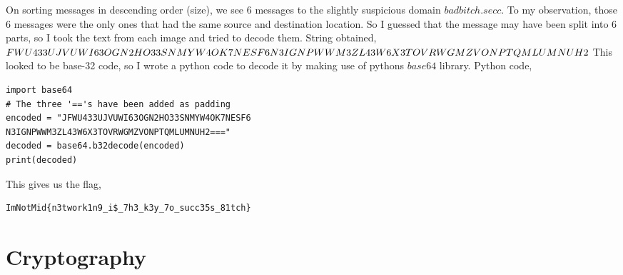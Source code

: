 \documentclass{article}
\begin{document}
\newline On sorting messages in descending order (size), we see 6 messages to the slightly suspicious domain $badbitch.secc$. To my observation, those 6 messages were the only ones that had the same source and destination location. So I guessed that the message may have been split into 6 parts, so I took the text from each image and tried to decode them. \newline \newline 
String obtained, $FWU433UJVUWI63OGN2HO33SNMYW4OK7NESF6\\N3IGNPWWM3ZL43W6X3TOVRWGMZVONPTQMLUMNUH2$\newline \newline 
This looked to be base-32 code, so I wrote a python code to decode it by making use of pythons $base64$ library. Python code,
\begin{verbatim}
import base64
# The three '=='s have been added as padding
encoded = "JFWU433UJVUWI63OGN2HO33SNMYW4OK7NESF6
N3IGNPWWM3ZL43W6X3TOVRWGMZVONPTQMLUMNUH2==="
decoded = base64.b32decode(encoded)
print(decoded)
\end{verbatim}
This gives us the flag, 
\begin{verbatim}
ImNotMid{n3twork1n9_i$_7h3_k3y_7o_succ35s_81tch}
\end{verbatim}
\section{Cryptography}
\end{document}
